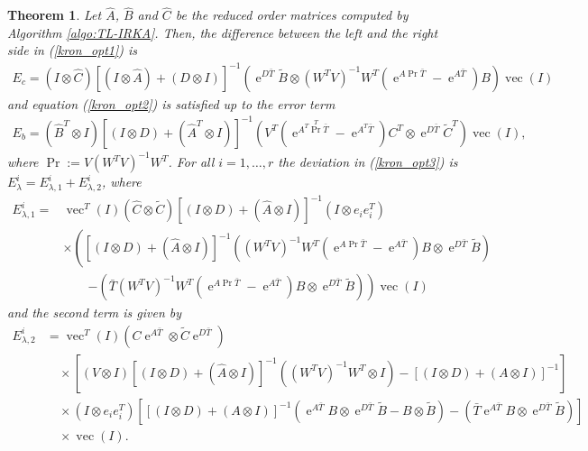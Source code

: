 \documentclass[a4paper,11pt, twoside]{article}
\newcommand{\expn}{\operatorname{e}}
\newcommand{\pro}{\operatorname{Pr}}
\newcommand{\vect}{\operatorname{vec}}
\newtheorem{thm}[defn]{Theorem}
\begin{document}
\begin{thm}\label{thm:error_opt_cond}
Let $\hat A$, $\hat B$ and $\hat C$ be the reduced order matrices computed by Algorithm \ref{algo:TL-IRKA}. Then, the difference between the left and 
the right side in (\ref{kron_opt1}) is \begin{align*}
             E_c =   (I\otimes \hat C)  \left[(I\otimes \hat A)+(D\otimes I)\right]^{-1}(\expn^{D \bar T}\tilde B \otimes (W^TV)^{-1}W^T(\expn^{A 
\pro\bar T}-\expn^{A \bar T}) B ) \vect(I)                       
                                       \end{align*}
and equation (\ref{kron_opt2}) is satisfied up to the error term \begin{align*}
             E_b =  (\hat B^T\otimes I) \left[(I\otimes D)+(\hat A^T\otimes I)\right]^{-1}(V^T(\expn^{ A^T \pro^T \bar T}-\expn^{ A^T \bar T})
C^T \otimes \expn^{D \bar T}\tilde C^T)\vect(I),                        
                                       \end{align*}
where $\pro:=V(W^TV)^{-1}W^T$. For all $i=1, \ldots, r$ the deviation in (\ref{kron_opt3}) is $E_{\lambda}^i=E_{\lambda, 1}^i+E_{\lambda, 2}^i$, 
where \begin{align*}
             E_{\lambda, 1}^i=     &\vect^T(I) (\hat C \otimes \tilde C) \left[(I\otimes D)+(\hat 
A\otimes I)\right]^{-1} (I\otimes e_i e_i^T) \\ \nonumber &\times \left( \left[(I\otimes 
D)+(\hat A\otimes I)\right]^{-1}  ((W^TV)^{-1} W^T(\expn^{A \pro \bar T}-\expn^{A \bar T}) B \otimes \expn^{D \bar T}\tilde 
B)\right.\\&\quad\quad \left.-(\bar T(W^TV)^{-1} W^T(\expn^{A \pro\bar T}-\expn^{A \bar 
T}) B \otimes \expn^{D \bar T}\tilde B)\right) \vect(I)                      
              \end{align*}
and the second term is given by \begin{align*}
 E_{\lambda, 2}^i&=\vect^T(I) (C \expn^{A \bar T} \otimes \tilde C \expn^{D \bar T})\\&\quad \times
 \left[(V\otimes I) \left[(I\otimes D)+(\hat A\otimes I)\right]^{-1} ((W^T V)^{-1}W^T \otimes I)- \left[(I\otimes D)+(A\otimes 
I)\right]^{-1}\right]  \\&\quad \times (I\otimes e_i e_i^T) 
 \left[\left[(I\otimes D)+(A\otimes I)\right]^{-1} (\expn^{A \bar T} B \otimes \expn^{D \bar T}\tilde B - B \otimes \tilde B)-(\bar T\expn^{A 
\bar T} B \otimes \expn^{D \bar T}\tilde B)\right]\\&\quad \times\vect(I).                            

\end{align*}
\end{thm}
\end{document}
